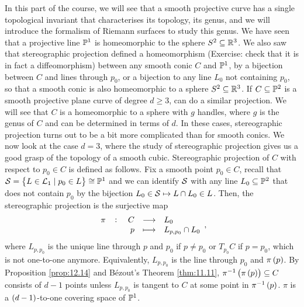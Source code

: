 In this part of the course, we will see that a smooth projective curve has a single topological invariant that characterises its topology, its genus, and we will introduce the formalism of Riemann surfaces to study this genus. We have seen that a projective line $ \P^1 $ is homeomorphic to the sphere $ S^2 \subseteq \R^3 $. We also saw that stereographic projection defined a homeomorphism (Exercise: check that it is in fact a diffeomorphism) between any smooth conic $ C $ and $ \P^1 $, by a bijection between $ C $ and lines through $ p_0 $, or a bijection to any line $ L_0 $ not containing $ p_0 $, so that a smooth conic is also homeomorphic to a sphere $ S^2 \subseteq \R^3 $. If $ C \subseteq \P^2 $ is a smooth projective plane curve of degree $ d \ge 3 $, can do a similar projection. We will see that $ C $ is a homeomorphic to a sphere with $ g $ handles, where $ g $ is the genus of $ C $ and can be determined in terms of $ d $. In these cases, stereographic projection turns out to be a bit more complicated than for smooth conics. We now look at the case $ d = 3 $, where the study of stereographic projection gives us a good grasp of the topology of a smooth cubic. Stereographic projection of $ C $ with respect to $ p_0 \in C $ is defined as follows. Fix a smooth point $ p_0 \in C $, recall that $ \SS = \cbr{L \in \LL_1 \mid p_0 \in L} \cong \P^1 $ and we can identify $ \SS $ with any line $ L_0 \subseteq \P^2 $ that does not contain $ p_0 $ by the bijection $ L_0 \in \SS \mapsto L \cap L_0 \in L $. Then, the stereographic projection is the surjective map
$$ \function[\pi]{C}{L_0}{p}{L_{p, p_0} \cap L_0}, $$
where $ L_{p, p_0} $ is the unique line through $ p $ and $ p_0 $ if $ p \ne p_0 $ or $ T_{p_0}C $ if $ p = p_0 $, which is not one-to-one anymore. Equivalently, $ L_{p, p_0} $ is the line through $ p_0 $ and $ \pi\br{p} $. By Proposition \ref{prop:12.14} and B\'ezout's Theorem \ref{thm:11.11}, $ \pi^{-1}\br{\pi\br{p}} \subseteq C $ consists of $ d - 1 $ points unless $ L_{p, p_0} $ is tangent to $ C $ at some point in $ \pi^{-1}\br{p} $. $ \pi $ is a $ \br{d - 1} $-to-one covering space of $ \P^1 $.


